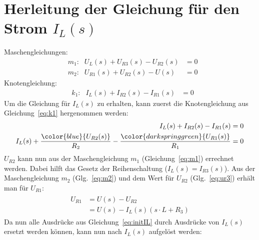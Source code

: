 \documentclass[11pt]{scrartcl}
\begin{document}
\section{Herleitung der Gleichung für den Strom $I_{L}(s)$}
Maschengleichungen:
\begin{align}
  &\text{$m_{1}$:}&U_{L}(s) + U_{R3}(s) - U_{R2}(s) &= 0 \label{eq:m1}\\
  &\text{$m_{2}$:}&U_{R1}(s) + U_{R2}(s) - U(s) &= 0 \label{eq:m2}
\end{align}
Knotengleichung:
\begin{align}\label{eq:k1}
  &\text{$k_{1}$:}&I_{L}(s) + I_{R2}(s) - I_{R1}(s) &= 0
\end{align}
Um die Gleichung für $I_{L}(s)$ zu erhalten, kann zuerst die Knotengleichung aus Gleichung~\ref{eq:k1} hergenommen werden:
\begin{align}\label{eq:initIL}
  \begin{split}
  I_{L}(s) + I_{R2}(s) - I_{R1}(s) &= 0 \\
  I_{L}(s) + \frac{{\color{blue}{U_{R2}(s)}}}{R_{2}} - \frac{{\color{darkspringgreen}{U_{R1}(s)}}}{R_{1}}&= 0
  \end{split}
\end{align}
$U_{R2}$ kann nun aus der Maschengleichung $m_{1}$ (Gleichung~\ref{eq:m1}) errechnet werden. Dabei hilft das Gesetz der Reihenschaltung ($I_{L}(s) = I_{R3}(s)$).
{}
Aus der Maschengleichung $m_{2}$ (Glg.~\ref{eq:m2}) und dem Wert für $U_{R2}$ (Glg.~\ref{eq:ur3}) erhält man für $U_{R1}$:
\begin{align}
  \begin{split}
    U_{R1} &= U(s) - U_{R2} \\
    &= U(s) - I_{L}(s)\left( s\cdot L + R_{3}\right)
  \end{split}
\end{align}
Da nun alle Ausdrücke aus Gleichung~\ref{eq:initIL} durch Ausdrücke von $I_{L}(s)$ ersetzt werden können, kann nun nach $I_{L}(s)$ aufgelöst werden:
\end{document}
